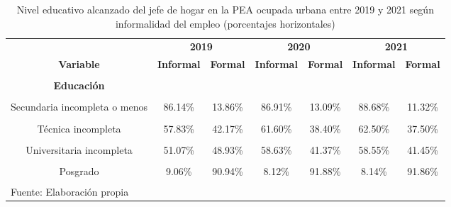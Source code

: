 \documentclass[
  letterpaper,
  12pt,
  oneside,
  spanish,
  doublespacing,
  headsepline,
  parskip]{MastersDoctoralThesis}
\begin{document}
\hypertarget{tbl-edu}{}
\begin{table}[H]
\caption{\label{tbl-edu}Nivel educativo alcanzado del jefe de hogar en la PEA ocupada urbana
entre 2019 y 2021 según informalidad del empleo (porcentajes
horizontales) }\tabularnewline

\centering\begingroup\fontsize{10}{12}\selectfont

\begin{tabular}{ccccccc}
\toprule
\multicolumn{1}{c}{ } & \multicolumn{2}{c}{\textbf{2019}} & \multicolumn{2}{c}{\textbf{2020}} & \multicolumn{2}{c}{\textbf{2021}} \\
\cmidrule(l{3pt}r{3pt}){2-3} \cmidrule(l{3pt}r{3pt}){4-5} \cmidrule(l{3pt}r{3pt}){6-7}
\textbf{Variable} & \textbf{Informal} & \textbf{Formal} & \textbf{Informal} & \textbf{Formal} & \textbf{Informal} & \textbf{Formal}\\
\midrule
\cellcolor{gray!6}{\textbf{Nacional}} & \cellcolor{gray!6}{62.98\%} & \cellcolor{gray!6}{37.02\%} & \cellcolor{gray!6}{66.17\%} & \cellcolor{gray!6}{33.83\%} & \cellcolor{gray!6}{68.45\%} & \cellcolor{gray!6}{31.55\%}\\
\textbf{Educación} &  &  &  &  &  & \\
\cellcolor{gray!6}{Sin nivel} & \cellcolor{gray!6}{92.71\%} & \cellcolor{gray!6}{7.29\%} & \cellcolor{gray!6}{93.52\%} & \cellcolor{gray!6}{6.48\%} & \cellcolor{gray!6}{95.58\%} & \cellcolor{gray!6}{4.42\%}\\
Secundaria incompleta o menos & 86.14\% & 13.86\% & 86.91\% & 13.09\% & 88.68\% & 11.32\%\\
\cellcolor{gray!6}{Secundaria completa} & \cellcolor{gray!6}{66.49\%} & \cellcolor{gray!6}{33.51\%} & \cellcolor{gray!6}{71.54\%} & \cellcolor{gray!6}{28.46\%} & \cellcolor{gray!6}{72.47\%} & \cellcolor{gray!6}{27.53\%}\\
\addlinespace
Técnica incompleta & 57.83\% & 42.17\% & 61.60\% & 38.40\% & 62.50\% & 37.50\%\\
\cellcolor{gray!6}{Técnica completa} & \cellcolor{gray!6}{39.25\%} & \cellcolor{gray!6}{60.75\%} & \cellcolor{gray!6}{38.92\%} & \cellcolor{gray!6}{61.08\%} & \cellcolor{gray!6}{42.80\%} & \cellcolor{gray!6}{57.20\%}\\
Universitaria incompleta & 51.07\% & 48.93\% & 58.63\% & 41.37\% & 58.55\% & 41.45\%\\
\cellcolor{gray!6}{Universitaria completa} & \cellcolor{gray!6}{25.03\%} & \cellcolor{gray!6}{74.97\%} & \cellcolor{gray!6}{24.89\%} & \cellcolor{gray!6}{75.11\%} & \cellcolor{gray!6}{26.88\%} & \cellcolor{gray!6}{73.12\%}\\
Posgrado & 9.06\% & 90.94\% & 8.12\% & 91.88\% & 8.14\% & 91.86\%\\
\bottomrule
\multicolumn{7}{l}{\textsuperscript{} Fuente: Elaboración propia}\\
\end{tabular}
\endgroup{}
\end{table}
\end{document}
